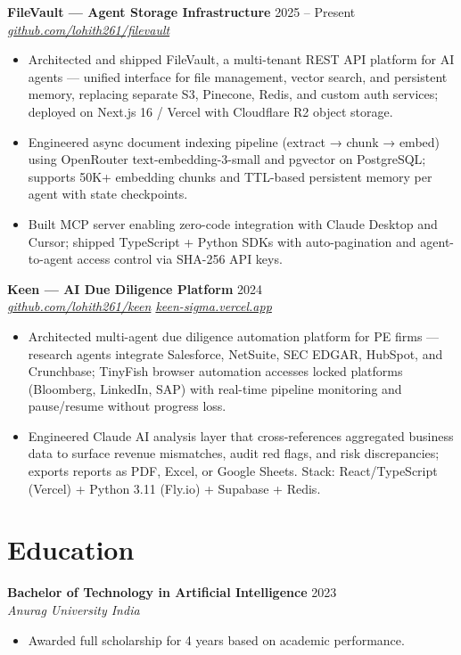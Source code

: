 \documentclass[10pt,letterpaper]{article}
\newcommand{\entry}[3]{%
  \vspace{3pt}\textbf{#1} \hfill #3 \\
  \textit{\small #2}\vspace{1pt}}
\begin{document}
\entry{FileVault --- Agent Storage Infrastructure}{\href{https://github.com/lohith261/filevault}{github.com/lohith261/filevault}}{2025 -- Present}
\begin{itemize}
  \item Architected and shipped FileVault, a multi-tenant REST API platform for AI agents --- unified interface for file management, vector search, and persistent memory, replacing separate S3, Pinecone, Redis, and custom auth services; deployed on Next.js 16 / Vercel with Cloudflare R2 object storage.
  \item Engineered async document indexing pipeline (extract → chunk → embed) using OpenRouter text-embedding-3-small and pgvector on PostgreSQL; supports 50K+ embedding chunks and TTL-based persistent memory per agent with state checkpoints.
  \item Built MCP server enabling zero-code integration with Claude Desktop and Cursor; shipped TypeScript + Python SDKs with auto-pagination and agent-to-agent access control via SHA-256 API keys.
\end{itemize}

\entry{Keen --- AI Due Diligence Platform}{\href{https://github.com/lohith261/keen}{github.com/lohith261/keen} \quad\textbullet\quad \href{https://keen-sigma.vercel.app/}{keen-sigma.vercel.app}}{2024}
\begin{itemize}
  \item Architected multi-agent due diligence automation platform for PE firms --- research agents integrate Salesforce, NetSuite, SEC EDGAR, HubSpot, and Crunchbase; TinyFish browser automation accesses locked platforms (Bloomberg, LinkedIn, SAP) with real-time pipeline monitoring and pause/resume without progress loss.
  \item Engineered Claude AI analysis layer that cross-references aggregated business data to surface revenue mismatches, audit red flags, and risk discrepancies; exports reports as PDF, Excel, or Google Sheets. Stack: React/TypeScript (Vercel) + Python 3.11 (Fly.io) + Supabase + Redis.
\end{itemize}

\section{Education}

\entry{Bachelor of Technology in Artificial Intelligence}{Anurag University \textbullet{} India}{2023}
\begin{itemize}
  \item Awarded full scholarship for 4 years based on academic performance.
\end{itemize}
\end{document}
